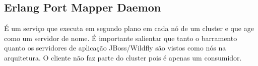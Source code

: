 \subsection{Erlang Port Mapper Daemon}

É um serviço que executa em 
segundo plano em cada nó de um cluster e que age como um servidor de nome.
É importante salientar que tanto o barramento quanto os
servidores de aplicação JBoss/Wildfly são vistos como nós 
na arquitetura. O cliente não faz parte do cluster pois é apenas um consumidor.


